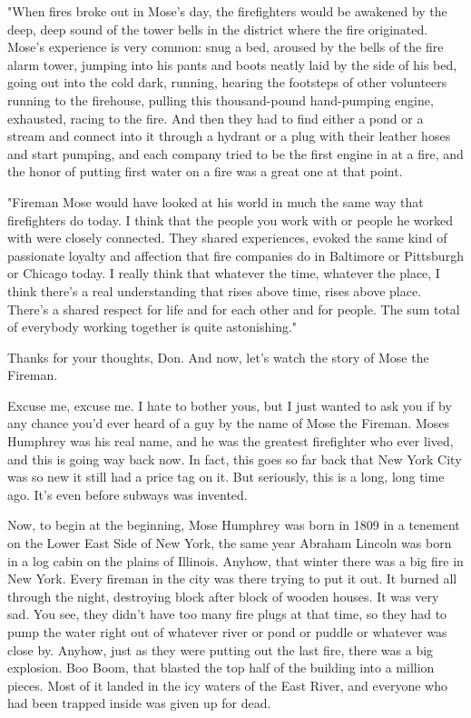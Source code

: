 "When fires broke out in Mose's day, the firefighters would be awakened by the deep, deep sound of the tower bells in the district where the fire originated. Mose's experience is very common: snug a bed, aroused by the bells of the fire alarm tower, jumping into his pants and boots neatly laid by the side of his bed, going out into the cold dark, running, hearing the footsteps of other volunteers running to the firehouse, pulling this thousand-pound hand-pumping engine, exhausted, racing to the fire. And then they had to find either a pond or a stream and connect into it through a hydrant or a plug with their leather hoses and start pumping, and each company tried to be the first engine in at a fire, and the honor of putting first water on a fire was a great one at that point.

"Fireman Mose would have looked at his world in much the same way that firefighters do today. I think that the people you work with or people he worked with were closely connected. They shared experiences, evoked the same kind of passionate loyalty and affection that fire companies do in Baltimore or Pittsburgh or Chicago today. I really think that whatever the time, whatever the place, I think there's a real understanding that rises above time, rises above place. There's a shared respect for life and for each other and for people. The sum total of everybody working together is quite astonishing."

Thanks for your thoughts, Don. And now, let's watch the story of Mose the Fireman.

Excuse me, excuse me. I hate to bother yous, but I just wanted to ask you if by any chance you'd ever heard of a guy by the name of Mose the Fireman. Moses Humphrey was his real name, and he was the greatest firefighter who ever lived, and this is going way back now. In fact, this goes so far back that New York City was so new it still had a price tag on it. But seriously, this is a long, long time ago. It's even before subways was invented.

Now, to begin at the beginning, Mose Humphrey was born in 1809 in a tenement on the Lower East Side of New York, the same year Abraham Lincoln was born in a log cabin on the plains of Illinois. Anyhow, that winter there was a big fire in New York. Every fireman in the city was there trying to put it out. It burned all through the night, destroying block after block of wooden houses. It was very sad. You see, they didn't have too many fire plugs at that time, so they had to pump the water right out of whatever river or pond or puddle or whatever was close by. Anyhow, just as they were putting out the last fire, there was a big explosion. Boo Boom, that blasted the top half of the building into a million pieces. Most of it landed in the icy waters of the East River, and everyone who had been trapped inside was given up for dead.

